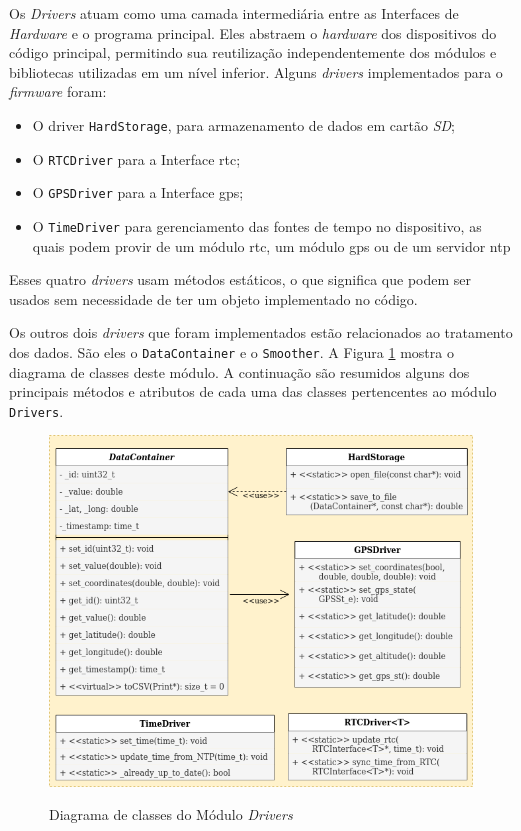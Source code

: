 Os \textit{Drivers} atuam como uma camada intermediária entre as Interfaces de \textit{Hardware} e o programa principal. Eles abstraem o \textit{hardware} dos dispositivos do código principal, permitindo sua reutilização independentemente dos módulos e bibliotecas utilizadas em um nível inferior. Alguns \textit{drivers} implementados para o \textit{firmware} foram:

\begin{itemize}
    \item O driver \texttt{HardStorage}, para armazenamento de dados em cartão \textit{SD}; 
    \item O \texttt{RTCDriver} para a Interface \acrshort{rtc};
    \item O \texttt{GPSDriver} para a Interface \acrshort{gps}; 
    \item O \texttt{TimeDriver} para gerenciamento das fontes de tempo no dispositivo, as quais podem provir de um módulo \acrshort{rtc}, um módulo \acrshort{gps} ou de um servidor \acrshort{ntp}
\end{itemize}

Esses quatro \textit{drivers} usam métodos estáticos, o que significa que podem ser usados sem necessidade de ter um objeto implementado no código. 

Os outros dois \textit{drivers} que foram implementados estão relacionados ao tratamento dos dados. São eles o \texttt{DataContainer} e o \texttt{Smoother}. A Figura \ref{fig:fw-libraries-drivers} mostra o diagrama de classes deste módulo. A continuação são resumidos alguns dos principais métodos e atributos de cada uma das classes pertencentes ao módulo \texttt{Drivers}.

\begin{figure}[h]
    \centering
    \caption{Diagrama de classes do Módulo \textit{Drivers}}
    \includegraphics[width=0.90\linewidth]{chapters//2-CLEAN/Figuras/Diagrama-de-classes-System-Drivers-1.png}
    \label{fig:fw-libraries-drivers}
\end{figure}

